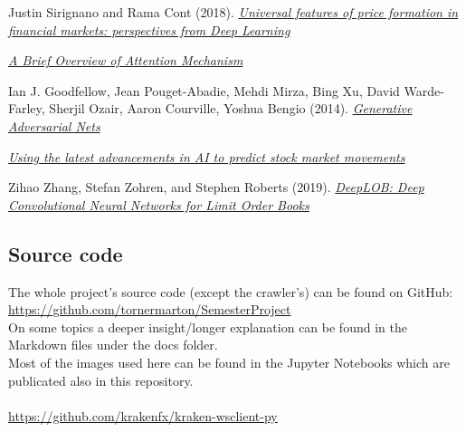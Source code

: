 \documentclass[11pt,a4paper,oneside]{article}
\begin{document}
\begin{references}{9}
\label{sec:tanulm-irod-jegyz}

 Justin Sirignano and Rama Cont (2018). \emph{
\href{https://arxiv.org/abs/1803.06917.pdf}{Universal features of price formation in financial markets: perspectives from Deep Learning}}

 \emph{\href{https://medium.com/syncedreview/a-brief-overview-of-attention-mechanism-13c578ba9129}{A Brief Overview of Attention Mechanism}}

 Ian J. Goodfellow, Jean Pouget-Abadie, Mehdi Mirza, Bing Xu, David Warde-Farley, Sherjil Ozair, Aaron Courville, Yoshua Bengio (2014). \emph{
\href{http://papers.nips.cc/paper/5423-generative-adversarial-nets.pdf}{Generative Adversarial Nets}}

 \emph{\href{https://github.com/borisbanushev/stockpredictionai}{Using the latest advancements in AI to predict stock market movements}}

 Zihao Zhang, Stefan Zohren, and Stephen Roberts (2019). \emph{
\href{https://arxiv.org/abs/1803.06917.pdf}{DeepLOB: Deep Convolutional Neural Networks for Limit Order Books}}

\end{references}

\subsection{Source code}
\label{sec:source_code}

The whole project's source code (except the crawler's) can be found on GitHub: \\ 
\url{https://github.com/tornermarton/SemesterProject} \\
On some topics a deeper insight/longer explanation can be found in the Markdown files under the docs folder. \\
Most of the images used here can be found in the Jupyter Notebooks which are publicated also in this repository. \\

\vspace{5mm}
 \\
\url{https://github.com/krakenfx/kraken-wsclient-py} 
\end{document}
